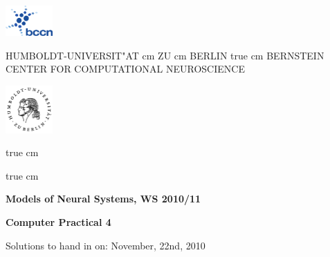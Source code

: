 \documentclass[12pt, a4]{article}
\begin{document}
\parbox{2cm}{
\includegraphics[width=1.8cm]{bccnlogo.pdf}
}
\parbox{11cm}{
\begin{center}
\large HUMBOLDT-UNIVERSIT"AT  cm ZU  cm BERLIN
 true cm
\mgross BERNSTEIN CENTER FOR COMPUTATIONAL NEUROSCIENCE
\end{center}
}
\parbox{2cm}
{
\hfill
\includegraphics[width=1.8cm]{hublogo.pdf}
}

 true cm



 true cm
\centerline{\bf Models of Neural Systems, WS 2010/11}
\centerline{\bf Computer Practical 4}
\centerline{Solutions to hand in on: November, 22nd, 2010}
\end{document}
